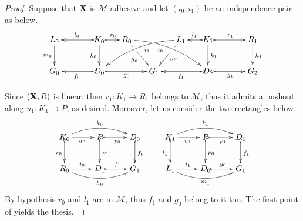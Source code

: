 \documentclass[a4paper,UKenglish,cleveref,pdftex,thm-restate,numberwithinsect,anonymous]{lipics}
\def\R{\mathsf{R}}
\def\X{\textbf {\textup{X}}}
\def\G{\textbf {\textup{G}}}
\begin{document}
\propEqui*
\label{propEqui-proof}

\begin{proof}
  Suppose that $\X$ is $\mathcal{M}$-adhesive and let $(i_0, i_1)$ be
  an independence pair as below.
  \[
    \xymatrix@C=15pt{L_0 \ar[d]_{m_0}&& K_0
      \ar[d]_{k_0}\ar@{>->}[ll]_{l_0} \ar@{>->}[r]^{r_0} & R_0
      \ar@/^.35cm/[drrr]|(.3)\hole_(.4){i_0} \ar[dr]|(.3)\hole_{h_0}
      && L_1 \ar@/_.35cm/[dlll]^(.4){i_1} \ar[dl]|(.3)\hole^{m_1}& K_1
      \ar[d]^{k_1}\ar@{>->}[l]_{l_1} \ar@{>->}[rr]^{r_1} && R_1
      \ar[d]^{h_1} \\G_0 && \ar@{>->}[ll]^{f_0} D_0
      \ar@{>->}[rr]_{g_0}&& G_1 && \ar@{>->}[ll]^{f_1} D_1
      \ar@{>->}[rr]_{g_1}&& G_2}\]

  Since $(\X, \R)$ is linear, then $r_1\colon K_1\to R_1$ belongs to
  $\mathcal{M}$, thus it admits a pushout along $u_1\colon K_1\to P$,
  as desired. Moreover, let us consider the two rectangles below.
  \[
    \xymatrix{K_0 \ar@/^.4cm/[rr]^{k_0}\ar@{>->}[d]_{r_0}\ar[r]_{u_0}
      &P\ar@{>->}[d]^{p_1} \ar@{>->}[r]_{p_0} & D_0
      \ar@{>->}[d]^{f_0}& K_1
      \ar@/^.4cm/[rr]^{k_1}\ar@{>->}[d]_{l_1}\ar[r]_{u_1}
      &P\ar@{>->}[d]^{p_0} \ar@{>->}[r]_{p_1} & D_1
      \ar@{>->}[d]^{f_1}\\ R_0 \ar@/_.4cm/[rr]_{h_0} \ar[r]^{i_0}&D_1
      \ar@{>->}[r]^{f_1} & G_1& L_1 \ar@/_.4cm/[rr]_{m_1}
      \ar[r]^{i_1}&D_0 \ar@{>->}[r]^{g_0} & G_1} \] By hypothesis
  $r_0$ and $l_1$ are in $\mathcal{M}$, thus $f_1$ and $g_0$ belong to
  it too. The first point of  yields the thesis.
\end{proof}
\end{document}

